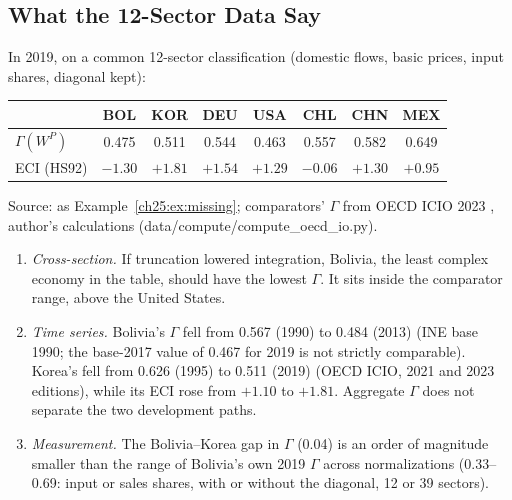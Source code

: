 \documentclass[../structural_economics_book.tex]{subfiles}
\begin{document}
\subsection{What the 12-Sector Data Say}
\label{ch25:sec:data}

\begin{empiricalresult}\label{ch25:res:twelve}
In 2019, on a common 12-sector classification (domestic flows, basic prices, input shares, diagonal kept):
\begin{center}
\begin{tabular}{lccccccc}
\toprule
& BOL & KOR & DEU & USA & CHL & CHN & MEX \\
\midrule
$\Gamma(W^P)$ & 0.475 & 0.511 & 0.544 & 0.463 & 0.557 & 0.582 & 0.649 \\
ECI (HS92) & $-1.30$ & $+1.81$ & $+1.54$ & $+1.29$ & $-0.06$ & $+1.30$ & $+0.95$ \\
\bottomrule
\end{tabular}
\par\footnotesize Source: as Example~\ref{ch25:ex:missing}; comparators' $\Gamma$ from OECD ICIO 2023 \citep{oecd2023icio}, author's calculations (data/compute/compute\_oecd\_io.py).
\end{center}
\begin{enumerate}
\item \emph{Cross-section.} If truncation lowered integration, Bolivia, the least complex economy in the table, should have the lowest $\Gamma$. It sits inside the comparator range, above the United States.
\item \emph{Time series.} Bolivia's $\Gamma$ fell from 0.567 (1990) to 0.484 (2013) (INE base 1990; the base-2017 value of 0.467 for 2019 is not strictly comparable). Korea's fell from 0.626 (1995) to 0.511 (2019) (OECD ICIO, 2021 and 2023 editions), while its ECI rose from $+1.10$ to $+1.81$. Aggregate $\Gamma$ does not separate the two development paths.
\item \emph{Measurement.} The Bolivia--Korea gap in $\Gamma$ (0.04) is an order of magnitude smaller than the range of Bolivia's own 2019 $\Gamma$ across normalizations (0.33--0.69: input or sales shares, with or without the diagonal, 12 or 39 sectors).
\end{enumerate}
\end{empiricalresult}
\end{document}
